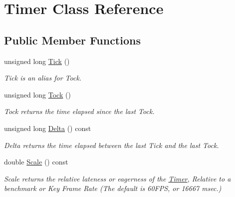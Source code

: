\hypertarget{class_timer}{\section{Timer Class Reference}
\label{class_timer}
}
\subsection*{Public Member Functions}
\begin{DoxyCompactItemize}
\item 
unsigned long \hyperlink{class_timer_a4e69d3c5a312d1b29d1735b2c5bccefb}{Tick} ()
\begin{DoxyCompactList}\small\item\em Tick is an alias for Tock. \end{DoxyCompactList}\item 
unsigned long \hyperlink{class_timer_a2c58a2e04e1e30926805aa4e82d2a0a5}{Tock} ()
\begin{DoxyCompactList}\small\item\em Tock returns the time elapsed since the last Tock. \end{DoxyCompactList}\item 
unsigned long \hyperlink{class_timer_a4f68da5b62cb1d1b2dd0c8549eb6286d}{Delta} () const 
\begin{DoxyCompactList}\small\item\em Delta returns the time elapsed between the last Tick and the last Tock. \end{DoxyCompactList}\item 
double \hyperlink{class_timer_a25ed035b0da5b177050c922660acf864}{Scale} () const 
\begin{DoxyCompactList}\small\item\em Scale returns the relative lateness or eagerness of the \hyperlink{class_timer}{Timer}, Relative to a benchmark or Key Frame Rate (The default is 60\-F\-P\-S, or 16667 msec.) \end{DoxyCompactList}\end{DoxyCompactItemize}

